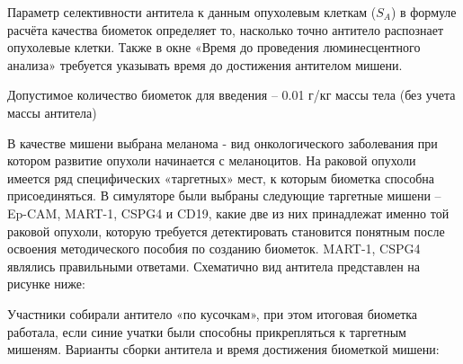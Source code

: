 Параметр селективности антитела к данным опухолевым клеткам ($S_A$) в формуле расчёта качества биометок определяет то, насколько точно антитело распознает опухолевые клетки. Также в окне «Время до проведения люминесцентного анализа» требуется указывать время до достижения антителом мишени.

Допустимое количество биометок для введения – 0.01 г/кг массы тела (без учета массы антитела)

В качестве мишени выбрана меланома - вид онкологического заболевания при котором развитие опухоли начинается с меланоцитов. На раковой опухоли имеется ряд специфических «таргетных» мест, к которым биометка способна присоединяться. В симуляторе были выбраны следующие таргетные мишени – Ep-CAM, MART-1, CSPG4 и CD19, какие две из них принадлежат именно той раковой опухоли, которую требуется детектировать становится понятным после освоения методического пособия по созданию биометок. MART-1, CSPG4 являлись правильными ответами. Схематично вид антитела представлен на рисунке ниже:

 
Участники собирали антитело «по кусочкам», при этом итоговая биометка работала, если синие учатки были способны прикрепляться к таргетным мишеням. Варианты сборки антитела и время достижения биометкой мишени:

